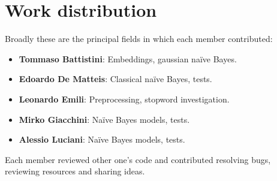 \section*{Work distribution}
Broadly these are the principal fields in which each member contributed:

\begin{itemize}
    \item \textbf{Tommaso Battistini}: Embeddings, gaussian na\"ive Bayes.
    \item \textbf{Edoardo De Matteis}: Classical na\"ive Bayes, tests.
    \item \textbf{Leonardo Emili}: Preprocessing, stopword investigation.
    \item \textbf{Mirko Giacchini}: Na\"ive Bayes models, tests.
    \item \textbf{Alessio Luciani}: Na\"ive Bayes models, tests.
\end{itemize}

Each member reviewed other one's code and contributed resolving bugs, reviewing resources and sharing ideas. 
